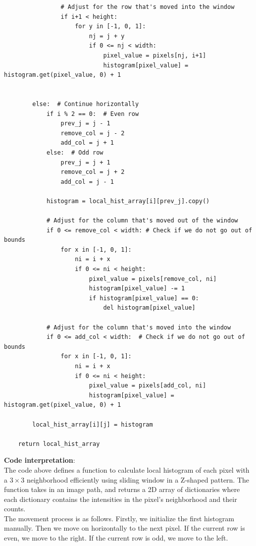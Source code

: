 \documentclass[UTF8]{ctexart}
\begin{document}
\begin{lstlisting}
                # Adjust for the row that's moved into the window
                if i+1 < height:
                    for y in [-1, 0, 1]:
                        nj = j + y
                        if 0 <= nj < width:
                            pixel_value = pixels[nj, i+1]
                            histogram[pixel_value] = histogram.get(pixel_value, 0) + 1

            
        else:  # Continue horizontally
            if i % 2 == 0:  # Even row
                prev_j = j - 1
                remove_col = j - 2
                add_col = j + 1
            else:  # Odd row
                prev_j = j + 1
                remove_col = j + 2
                add_col = j - 1
        
            histogram = local_hist_array[i][prev_j].copy()
            
            # Adjust for the column that's moved out of the window
            if 0 <= remove_col < width: # Check if we do not go out of bounds
                for x in [-1, 0, 1]:
                    ni = i + x
                    if 0 <= ni < height:
                        pixel_value = pixels[remove_col, ni]
                        histogram[pixel_value] -= 1
                        if histogram[pixel_value] == 0:
                            del histogram[pixel_value]

            # Adjust for the column that's moved into the window
            if 0 <= add_col < width:  # Check if we do not go out of bounds
                for x in [-1, 0, 1]:
                    ni = i + x
                    if 0 <= ni < height:
                        pixel_value = pixels[add_col, ni]
                        histogram[pixel_value] = histogram.get(pixel_value, 0) + 1

        local_hist_array[i][j] = histogram
    
    return local_hist_array
\end{lstlisting}
\textbf{Code interpretation}:\\
The code above defines a function to calculate local histogram of each pixel with a $3\times3$ neighborhood efficiently using sliding window in a Z-shaped pattern.
The function takes in an image path, and returns a 2D array of dictionaries where each dictionary contains the intensities in the pixel's neighborhood and their counts.\\
The movement process is as follows. Firstly, we initialize the first histogram manually. Then we move on horizontally to the next pixel. If the current row is even, we move to the right. If the current row is odd, we move to the left.
\end{document}
